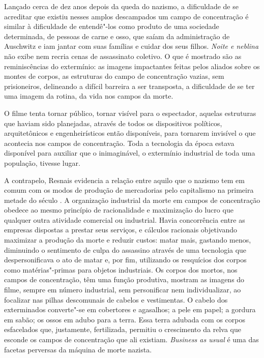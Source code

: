 Lançado cerca de dez anos depois da queda do nazismo, a dificuldade de
se acreditar que existiu nesses amplos descampados um campo de
concentração é similar à dificuldade de entendê"-los como produto de uma
sociedade determinada, de pessoas de carne e osso, que saíam da
administração de Auschwitz e iam jantar com suas famílias e cuidar dos
seus filhos. \emph{Noite e neblina} não exibe nem recria cenas de
assassinato coletivo. O que é mostrado são as reminiscências do
extermínio: as imagens impactantes feitas pelos aliados sobre os montes
de corpos, as estruturas do campo de concentração vazias, sem
prisioneiros, delineando a difícil barreira a ser transposta, a
dificuldade de se ter uma imagem da rotina, da vida nos campos da morte.

O filme tenta tornar público, tornar visível para o espectador, aquelas
estruturas que haviam sido planejadas, através de todos os dispositivos
políticos, arquitetônicos e engenheirísticos então disponíveis, para
tornarem invisível o que acontecia nos campos de concentração. Toda a
tecnologia da época estava disponível para auxiliar que o inimaginável,
o extermínio industrial de toda uma população, tivesse lugar.

A contrapelo, Resnais evidencia a relação entre aquilo que o nazismo tem
em comum com os modos de produção de mercadorias pelo capitalismo na
primeira metade do século . A organização industrial da morte em
campos de concentração obedece ao mesmo princípio de racionalidade e
maximização do lucro que qualquer outra atividade comercial ou
industrial. Havia concorrência entre as empresas dispostas a prestar
seus serviços, e cálculos racionais objetivando maximizar a produção da
morte e reduzir custos: matar mais, gastando menos, diminuindo o
sentimento de culpa do assassino através de uma tecnologia que
despersonificava o ato de matar e, por fim, utilizando os resquícios dos
corpos como matérias"-primas para objetos industriais. Os corpos dos
mortos, nos campos de concentração, têm uma função produtiva, mostram as
imagens do filme, sempre em número industrial, sem personificar nem
individualizar, ao focalizar nas pilhas descomunais de cabelos e
vestimentas. O cabelo dos exterminados converte"-se em cobertores e
agasalhos; a pele em papel; a gordura em sabão; os ossos em adubo para a
terra. Essa terra adubada com os corpos esfacelados que, justamente,
fertilizada, permitiu o crescimento da relva que esconde os campos de
concentração que ali existiam. \emph{Business as usual} é uma das
facetas perversas da máquina de morte nazista.

